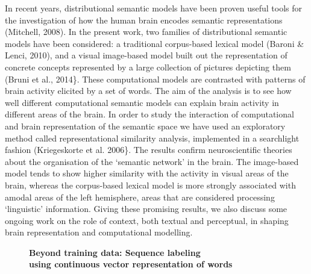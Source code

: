 \documentclass[10pt, a4paper, twopage, headinclude, footinclude, BCOR5mm]{scrartcl}
\begin{document}
{{        \begin{table}[t!]
    \end{table}

\noindent
In recent years, distributional semantic models have been proven useful tools for the investigation of how the human brain encodes semantic representations (Mitchell, 2008). In the present work, two families of distributional semantic models have been considered: a traditional corpus-based lexical model (Baroni \& Lenci, 2010), and a visual image-based model built out the representation of concrete concepts represented by a large collection of pictures depicting them (Bruni et al., 2014\}.   These computational models are contrasted with patterns of brain activity elicited by a set of words. The aim of the analysis is to see how well different computational semantic models can explain brain activity in different areas of the brain. In order to study the interaction of computational and brain representation of the semantic space we have used an exploratory method called representational similarity analysis, implemented in a searchlight fashion (Kriegeskorte et al. 2006\}.  The results confirm neuroscientific theories about the organisation of the ‘semantic network’ in the brain. The image-based model tends to show higher similarity with the activity in visual areas of the brain, whereas the corpus-based lexical model is more strongly associated with amodal areas of the left hemisphere, areas that are considered processing ‘linguistic’ information.  Giving these promising results, we also discuss some ongoing work on the role of context, both textual and perceptual, in shaping brain representation and computational modelling.


\newpage

\begin{figure}[t!]
\centering
\large\textbf{Beyond training data: Sequence labeling \\ using continuous vector representation of words}
\vspace*{0.5cm}
\end{figure}


}}
\end{document}
